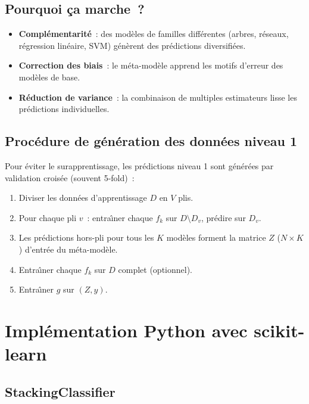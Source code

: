 \documentclass[a4paper,11pt]{article}
\theoremstyle{definition}
\theoremstyle{remark}
\begin{document}
\subsection{Pourquoi \c ca marche~?}

\begin{itemize}
  \item \textbf{Compl\'ementarit\'e}~: des mod\`eles de familles
    diff\'erentes (arbres, r\'eseaux, r\'egression lin\'eaire, SVM)
    g\'en\`erent des pr\'edictions diversifi\'ees.
  \item \textbf{Correction des biais}~: le m\'eta-mod\`ele apprend les
    motifs d'erreur des mod\`eles de base.
  \item \textbf{R\'eduction de variance}~: la combinaison de multiples
    estimateurs lisse les pr\'edictions individuelles.
\end{itemize}

\subsection{Proc\'edure de g\'en\'eration des donn\'ees niveau 1}

Pour \'eviter le surapprentissage, les pr\'edictions niveau 1 sont
g\'en\'er\'ees par validation crois\'ee (souvent 5-fold)~:

\begin{enumerate}
  \item Diviser les donn\'ees d'apprentissage $D$ en $V$ plis.
  \item Pour chaque pli $v$~: entra\^\i ner chaque $f_k$ sur
    $D\setminus D_v$, pr\'edire sur $D_v$.
  \item Les pr\'edictions hors-pli pour tous les $K$ mod\`eles forment
    la matrice $Z$ ($N\times K$) d'entr\'ee du m\'eta-mod\`ele.
  \item Entra\^\i ner chaque $f_k$ sur $D$ complet (optionnel).
  \item Entra\^\i ner $g$ sur $(Z, y)$.
\end{enumerate}

\section{Impl\'ementation Python avec scikit-learn}

\subsection{StackingClassifier}
\end{document}
